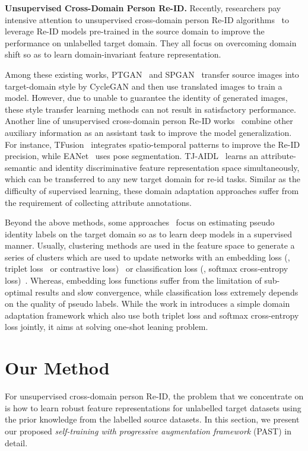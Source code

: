 \documentclass[10pt,twocolumn,letterpaper]{article}
\begin{document}
\noindent\textbf{Unsupervised Cross-Domain Person Re-ID.} Recently, researchers pay intensive attention to unsupervised cross-domain person Re-ID algorithms~\cite{PTGAN, SPGAN, TJ-AIDL, HHL, EANet, UMDL, PUL, tfusion, ARN, theory} to leverage Re-ID models pre-trained in the source domain to improve the performance on unlabelled target domain. They all focus on overcoming domain shift so as to learn domain-invariant feature representation. 

Among these existing works, PTGAN~\cite{PTGAN} and SPGAN~\cite{SPGAN}  transfer source images into target-domain style by CycleGAN and then use translated images to train a model. However, due to unable to guarantee the identity of  generated images, these style transfer learning methods can not result in satisfactory performance. 
Another line of unsupervised cross-domain person Re-ID works~\cite{TJ-AIDL, HHL, tfusion, EANet} combine other auxiliary information as an assistant task to improve the model generalization. 
For instance, TFusion~\cite{tfusion} integrates spatio-temporal patterns to improve the Re-ID precision, while EANet~\cite{EANet} uses pose segmentation. 
TJ-AIDL~\cite{TJ-AIDL} learns an attribute-semantic and identity discriminative feature representation space simultaneously, which can be transferred to any new target domain for re-id tasks. 
Similar as the difficulty of supervised learning, these domain adaptation approaches suffer from the requirement of collecting attribute annotations.

Beyond the above methods, some approaches~\cite{PUL, theory, tfusion} focus on estimating pseudo identity labels on the target domain so as to learn deep models in a supervised manner. 
Usually, clustering methods are used in the feature space to generate a series of clusters which are used to update networks with an embedding loss (\eg, triplet loss~\cite{batchhardtriplet} or contrastive loss)~\cite{theory, tfusion} or classification loss (\eg, softmax cross-entropy loss)~\cite{PUL}. 
Whereas, embedding loss functions suffer from the limitation of sub-optimal results and slow convergence, while classification loss extremely depends on the quality of pseudo labels.
While the work in \cite{oneshot}  introduces a simple domain adaptation framework which also use both triplet loss and softmax cross-entropy loss jointly, it aims at solving one-shot leaning problem.

\section{Our Method}
For unsupervised cross-domain person Re-ID, the problem that  we concentrate on is how to learn robust feature representations for unlabelled target datasets using the prior knowledge from the labelled source datasets. In this section, we present our proposed \emph{self-training with progressive augmentation framework} (PAST) in detail. 
\end{document}
